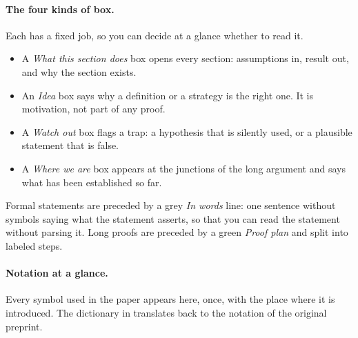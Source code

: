 \paragraph{The four kinds of box.} Each has a fixed job, so you can decide at a glance whether to
read it.
\begin{itemize}[leftmargin=1.2em,itemsep=1pt]
\item A \emph{What this section does} box opens every section: assumptions in, result out, and why
  the section exists.
\item An \emph{Idea} box says why a definition or a strategy is the right one. It is motivation,
  not part of any proof.
\item A \emph{Watch out} box flags a trap: a hypothesis that is silently used, or a plausible
  statement that is false.
\item A \emph{Where we are} box appears at the junctions of the long argument and says what has
  been established so far.
\end{itemize}
Formal statements are preceded by a grey \emph{In words} line: one sentence without symbols
saying what the statement asserts, so that you can read the statement without parsing it. Long
proofs are preceded by a green \emph{Proof plan} and split into labeled steps.

\paragraph{Notation at a glance.} Every symbol used in the paper appears here, once, with the
place where it is introduced. The dictionary in  translates back to the
notation of the original preprint.

